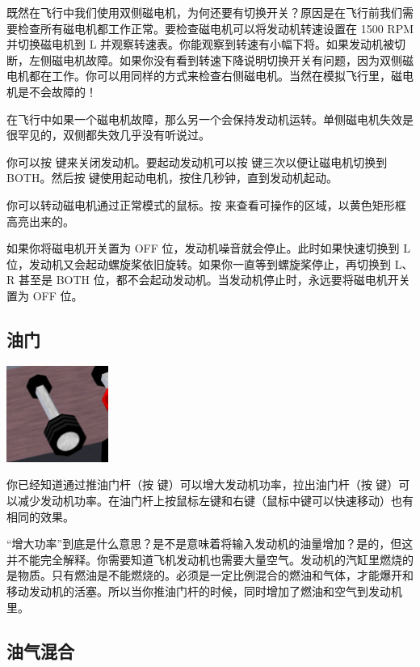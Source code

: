 既然在飞行中我们使用双侧磁电机，为何还要有切换开关？原因是在飞行前我们需要检查所有磁电机都工作正常。要检查磁电机可以将发动机转速设置在 1500 RPM 并切换磁电机到 L 并观察转速表。你能观察到转速有小幅下将。如果发动机被切断，左侧磁电机故障。如果你没有看到转速下降说明切换开关有问题，因为双侧磁电机都在工作。你可以用同样的方式来检查右侧磁电机。当然在模拟飞行里，磁电机是不会故障的！

在飞行中如果一个磁电机故障，那么另一个会保持发动机运转。单侧磁电机失效是很罕见的，双侧都失效几乎没有听说过。

你可以按 \key{\{} 键来关闭发动机。要起动发动机可以按 \key{\}} 键三次以便让磁电机切换到 BOTH。然后按  键使用起动电机，按住几秒钟，直到发动机起动。

你可以转动磁电机通过正常模式的鼠标。按  来查看可操作的区域，以黄色矩形框高亮出来的。

如果你将磁电机开关置为 OFF 位，发动机噪音就会停止。此时如果快速切换到 L 位，发动机又会起动螺旋桨依旧旋转。如果你一直等到螺旋桨停止，再切换到 L、R 甚至是 BOTH 位，都不会起动发动机。当发动机停止时，永远要将磁电机开关置为 OFF 位。

\subsection*{油门}

\begin{center}
\includegraphics[width=0.25\textwidth]{img/tut_29}
\end{center}

你已经知道通过推油门杆（按  键）可以增大发动机功率，拉出油门杆（按  键）可以减少发动机功率。在油门杆上按鼠标左键和右键（鼠标中键可以快速移动）也有相同的效果。

“增大功率”到底是什么意思？是不是意味着将输入发动机的油量增加？是的，但这并不能完全解释。你需要知道飞机发动机也需要大量空气。发动机的汽缸里燃烧的是物质。只有燃油是不能燃烧的。必须是一定比例混合的燃油和气体，才能爆开和移动发动机的活塞。所以当你推油门杆的时候，同时增加了燃油和空气到发动机里。

\subsection*{油气混合}

